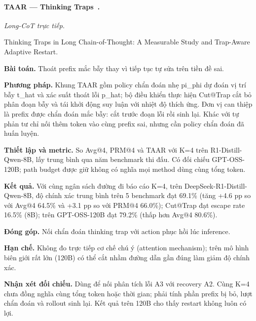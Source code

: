 \begin{samepage}
\paragraph{TAAR — Thinking Traps~\cite{rra2_taar}.}
\emph{Long-CoT trực tiếp.}\par
{\raggedright\noindent\small Thinking Traps in Long Chain-of-Thought: A Measurable Study and Trap-Aware Adaptive Restart.\par}
\noindent\textbf{Bài toán.} Thoát prefix mắc bẫy thay vì tiếp tục tự sửa trên tiền đề sai.\par
\end{samepage}
\noindent\textbf{Phương pháp.} Khung TAAR gồm policy chẩn đoán nhẹ pi\_phi dự đoán vị trí bẫy t\_hat và xác suất thoát lỗi p\_hat; bộ điều khiển thực hiện Cut@Trap cắt bỏ phân đoạn bẫy và tái khởi động suy luận với nhiệt độ thích ứng. Đơn vị can thiệp là prefix được chẩn đoán mắc bẫy: cắt trước đoạn lỗi rồi sinh lại. Khác với tự phản tư chỉ nối thêm token vào cùng prefix sai, nhưng cần policy chẩn đoán đã huấn luyện.\par
\noindent\textbf{Thiết lập và metric.} So Avg@4, PRM@4 và TAAR với K=4 trên R1-Distill-Qwen-8B, lấy trung bình qua năm benchmark thi đấu. Có đối chiếu GPT-OSS-120B; path budget được giữ không có nghĩa mọi method dùng cùng tổng token.\par
\noindent\textbf{Kết quả.} Với cùng ngân sách đường đi báo cáo K=4, trên DeepSeek-R1-Distill-Qwen-8B, độ chính xác trung bình trên 5 benchmark đạt 69.1\% (tăng +4.6 pp so với Avg@4 64.5\% và +3.1 pp so với PRM@4 66.0\%); Cut@Trap đạt escape rate 16.5\% (8B); trên GPT-OSS-120B đạt 79.2\% (thấp hơn Avg@4 80.6\%).\par
\noindent\textbf{Đóng góp.} Nối chẩn đoán thinking trap với action phục hồi lúc inference.\par
\noindent\textbf{Hạn chế.} Không đo trực tiếp cơ chế chú ý (attention mechanism); trên mô hình biên giới rất lớn (120B) có thể cắt nhầm đường dẫn gần đúng làm giảm độ chính xác.\par
\begin{samepage}
\noindent\textbf{Nhận xét đối chiếu.} Dùng để nối phân tích lỗi A3 với recovery A2. Cùng K=4 chưa đồng nghĩa cùng tổng token hoặc thời gian; phải tính phần prefix bị bỏ, lượt chẩn đoán và rollout sinh lại. Kết quả trên 120B cho thấy restart không luôn có lợi.\par
{}
\end{samepage}


